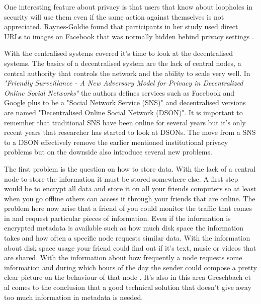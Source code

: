 One interesting feature about privacy is that users that know about loopholes in security will use them even if the same action against themselves is not appreciated.
Raynes-Goldie found that participants in her study used direct URLs to images on Facebook that was normally hidden behind privacy settings \cite{raynes-goldie2010}.

With the centralised systems covered it's time to look at the decentralised systems.
The basics of a decentralised system are the lack of central nodes, a central authority that controls the network and the ability to scale very well.
In \textit{"Friendly Surveillance - A New Adversary Model for Privacy in Decentralized Online Social Networks"} \cite{greschbach2012} the authors defines services such as Facebook and Google plus to be a "Social Network Service (SNS)" and decentralised versions are named "Decentralised Online Social Network (DSON)".
It is important to remember that traditional SNS have been online for several years but it's only recent years that researcher has started to look at DSONs.
The move from a SNS to a DSON effectively remove the earlier mentioned institutional privacy problems but on the downside also introduce several new problems.

The first problem is the question on how to store data.
With the lack of a central node to store the information it must be stored somewhere else.
A first step would be to encrypt all data and store it on all your friends computers so at least when you go offline others can access it through your friends that are online.
The problem here now arise that a friend of you could monitor the traffic that comes in and request particular pieces of information.
Even if the information is encrypted metadata is available such as how much disk space the information takes and how often a specific node requests similar data.
With the information about disk space usage your friend could find out if it's text, music or videos that are shared.
With the information about how frequently a node requests some information and during which hours of the day the sender could compose a pretty clear picture on the behaviour of that node \cite{greschbach2012}.
It's also in this area Greschbach et al \cite{greschbach2012} comes to the conclusion that a good technical solution that doesn't give away too much information in metadata is needed.

